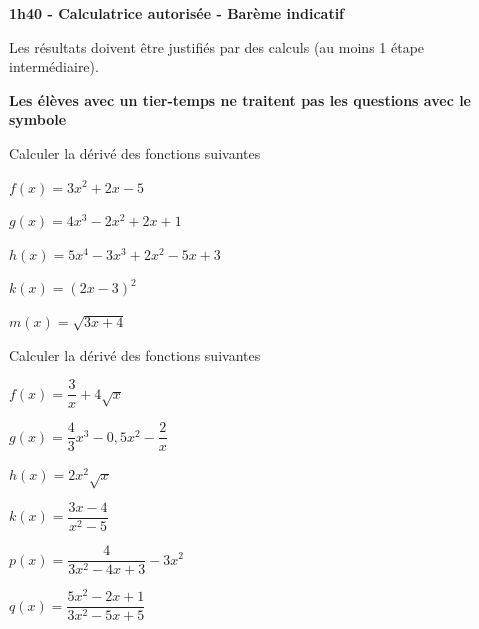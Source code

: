 \documentclass[12pt,a4paper]{article}  %
\begin{document}
\graphicspath{{../images/}}

\begin{center}

\end{center}


\begin{center}\textbf{1h40 - Calculatrice autorisée - Barème indicatif}\end{center}


\begin{center}
Les résultats doivent être justifiés par des calculs (au moins 1 étape intermédiaire).
\end{center}

\begin{center}\textbf{Les élèves avec un tier-temps ne traitent pas les questions avec  le symbole }\end{center}


Calculer la dérivé des fonctions suivantes
\begin{enumMet}
	\item $f(x)=3 x^{2}+2 x-5$
	\item {} $g(x)=4 x^{3}-2 x^{2}+2 x+1$
	\item $h(x)=5x^4-3x^3+2x^2-5x+3$
	\item {} $k(x)=(2 x-3)^{2}$
	\item $m(x)=\sqrt{3 x+4}$
\end{enumMet}


Calculer la dérivé des fonctions suivantes
\begin{enumMet}
	\item $f(x)=\dfrac{3}{x}+4 \sqrt{x}$
	\item {} $g(x)=\dfrac{4}{3} x^{3}-0,5 x^{2}-\dfrac{2}{x}$
	\item $h(x)=2 x^{2} \sqrt{x}$
	\item $k(x)=\dfrac{3 x-4}{x^{2}-5}$
	\item $p(x)=\dfrac{4}{3x^2-4x+3}-3x^2$
	\item $q(x)=\dfrac{5x^2-2x+1}{3x^2-5x+5}$
\end{enumMet}
\end{document}
